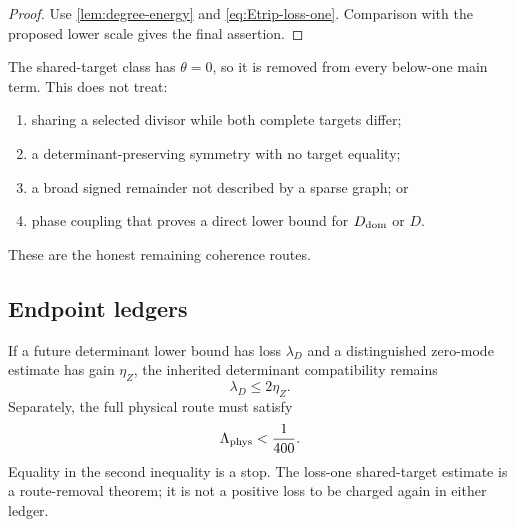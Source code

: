 \begin{proof}
Use \cref{lem:degree-energy} and
\eqref{eq:Etrip-loss-one}.  Comparison with the proposed lower scale
gives the final assertion.
\end{proof}

\begin{remark}
The shared-target class has \(\theta=0\), so it is removed from every
below-one main term.  This does not treat:
\begin{enumerate}[label=(\roman*),leftmargin=2.2em]
\item sharing a selected divisor while both complete targets differ;
\item a determinant-preserving symmetry with no target equality;
\item a broad signed remainder not described by a sparse graph; or
\item phase coupling that proves a direct lower bound for
  \(D_{\mathrm{dom}}\) or \(D\).
\end{enumerate}
These are the honest remaining coherence routes.
\end{remark}

\subsection{Endpoint ledgers}

If a future determinant lower bound has loss \(\lambda_D\) and a
distinguished zero-mode estimate has gain \(\eta_Z\), the inherited
determinant compatibility remains
\[
 \lambda_D\le2\eta_Z.
\]
Separately, the full physical route must satisfy
\[
 \Lambda_{\rm phys}<\frac1{400}.
\]
Equality in the second inequality is a stop.  The loss-one
shared-target estimate is a route-removal theorem; it is not a
positive loss to be charged again in either ledger.
